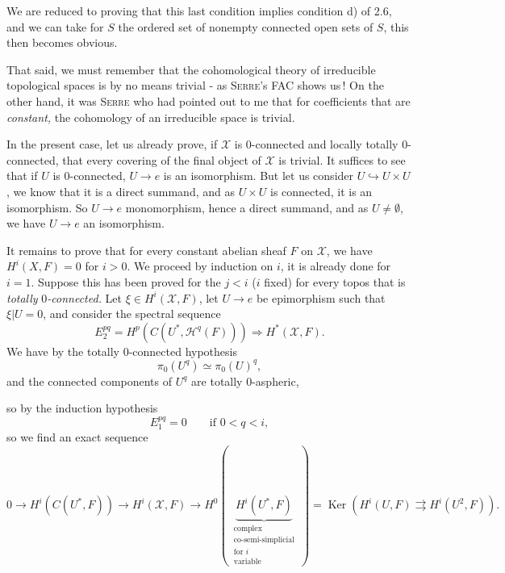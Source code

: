 \documentclass[11pt]{article}
\newcommand{\printedpage}[1]{\marginpar{\footnotesize p.~#1}}
\newcommand{\msp}[1]{\marginpar{\footnotesize [#1]}}
\newcommand{\Ker}{\operatorname{Ker}}
\begin{document}
\printedpage{19}

We are reduced to proving that this last condition implies condition d) of 2.6, and we can take for $S$ the ordered set of nonempty connected open sets of $S$, this then becomes obvious.

That said, we must remember that the cohomological theory of irreducible topological spaces is by no means trivial - as \textsc{Serre}'s FAC shows us\,! On the other hand, it was \textsc{Serre} who had pointed out to me that for coefficients that are \textit{constant,} the cohomology of an irreducible space is trivial.

In the present case, let us already prove, if $\mathcal{X}$ is 0-connected and locally totally 0-connected, that every covering of the final object of $\mathcal{X}$ is trivial. It suffices to see that if $U$ is 0-connected, $U \longrightarrow e$ is an isomorphism. But let us consider $U \hookrightarrow U \times U$, we know that it is a direct summand, and as $U \times U$ is connected, it is an isomorphism. So $U \longrightarrow e$ monomorphism, hence a direct summand, and as $U \neq \emptyset$, we have $U \longrightarrow e$ an isomorphism.

It remains to prove that for every constant abelian sheaf \msp{page 31} $F$ on $\mathcal{X}$, we have $H^i(X,F)=0$ for $i>0$. We proceed by induction on $i$, it is already done for $i=1$. Suppose this has been proved for the $j<i$ ($i$ fixed) for every topos that is \textit{totally} 0\textit{-connected.} Let $\xi \in H^i(\mathcal{X},F)$, let $U \longrightarrow e$ be epimorphism such that $\xi|U=0$, and consider the spectral sequence %
\[
E_2^{pq} = H^p(C(U^*,\mathcal{H}^q(F))) \Longrightarrow H^*(\mathcal{X},F).
\]
We have by the totally 0-connected hypothesis
\[
\pi_0(U^q) \simeq \pi_0(U)^q, \tag*{$(*)$}
\]
and the connected components of $U^q$ are totally 0-aspheric,
\begin{center}
\end{center}
so by the induction hypothesis
\[
E_1^{pq} = 0 \qquad \text{if } 0<q<i,
\]
so we find an exact sequence
\[
0 \longrightarrow H^i(C(U^*,F)) \longrightarrow H^i(\mathcal{X},F) \longrightarrow H^0(\ \underbrace{H^i(U^*,F)}_{\substack{\text{complex}\\ \text{co-semi-simplicial}\\ \text{for } i\\ \text{variable}}}\ ) = \Ker(H^i(U,F) \rightrightarrows H^i(U^2,F)).
\]
\end{document}
